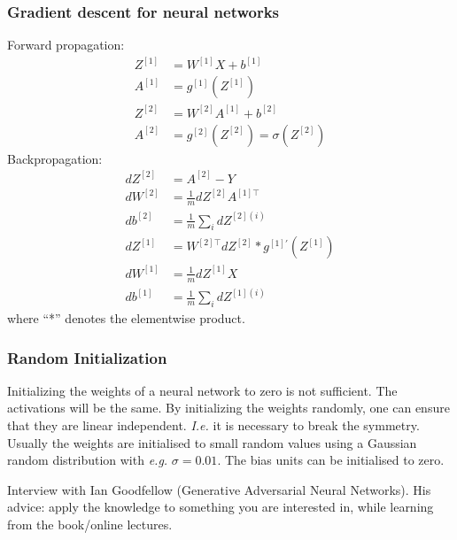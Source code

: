 \documentclass{article}
\begin{document}
\subsubsection{Gradient descent for neural networks}\label{cha:gradneural}
Forward propagation:
\begin{equation}
  \begin{split}
    Z^{[1]}&=W^{[1]}X+b^{[1]}\\
    A^{[1]}&=g^{[1]}(Z^{[1]})\\
    Z^{[2]}&=W^{[2]}A^{[1]}+b^{[2]}\\
    A^{[2]}&=g^{[2]}(Z^{[2]})=\sigma(Z^{[2]})
  \end{split}
\end{equation}
Backpropagation:
\begin{equation}
  \begin{split}
    dZ^{[2]}&=A^{[2]}-Y\\
    dW^{[2]}&=\frac{1}{m}dZ^{[2]}A^{[1]\top}\\
    db^{[2]}&=\frac{1}{m}\sum_i dZ^{[2](i)}\\
    dZ^{[1]}&=W^{[2]\top}dZ^{[2]}*g^{[1]\prime}(Z^{[1]})\\
    dW^{[1]}&=\frac{1}{m}dZ^{[1]}X\\
    db^{[1]}&=\frac{1}{m}\sum_i dZ^{[1](i)}
  \end{split}
\end{equation}
where ``*'' denotes the elementwise product.

\subsubsection{Random Initialization}
Initializing the weights of a neural network to zero is not sufficient.
The activations will be the same.
By initializing the weights randomly, one can ensure that they are linear independent.
\emph{I.e.} it is necessary to break the symmetry.
Usually the weights are initialised to small random values using a Gaussian random distribution with \emph{e.g.} $\sigma=0.01$.
The bias units can be initialised to zero.

Interview with Ian Goodfellow (Generative Adversarial Neural Networks).
His advice: apply the knowledge to something you are interested in, while learning from the book/online lectures.
\end{document}

